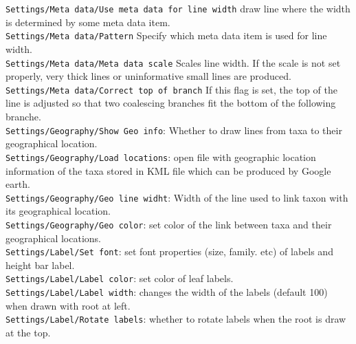\documentclass{article}
\begin{document}
\noindent
{\tt Settings/Meta data/Use meta data for line width} draw line where the width is determined by some meta data item.\\
{\tt Settings/Meta data/Pattern} Specify which meta data item is used for line width.\\
{\tt Settings/Meta data/Meta data scale} Scales line width. If the scale is not set properly, very thick lines or uninformative small lines are produced.\\
{\tt Settings/Meta data/Correct top of branch} If this flag is set, the top of the line is adjusted so that two coalescing branches fit the bottom of the following branche.\\

\noindent
{\tt Settings/Geography/Show Geo info}: Whether to draw lines from taxa to their geographical location.\\
{\tt Settings/Geography/Load locations}: open file with geographic location information of the taxa stored in
KML file which can be produced by Google earth.\\
{\tt Settings/Geography/Geo line widht}: Width of the line used to link taxon with its geographical location.\\
{\tt Settings/Geography/Geo color}: set color of the link between taxa and their geographical locations.\\

\noindent
{\tt Settings/Label/Set font}: set font properties (size, family. etc) of labels and height bar label.\\
{\tt Settings/Label/Label color}: set color of leaf labels.\\
{\tt Settings/Label/Label width}: changes the width of the labels (default 100) when drawn with root at left.\\
{\tt Settings/Label/Rotate labels}: whether to rotate labels when the root is draw at the top.\\
\end{document}
